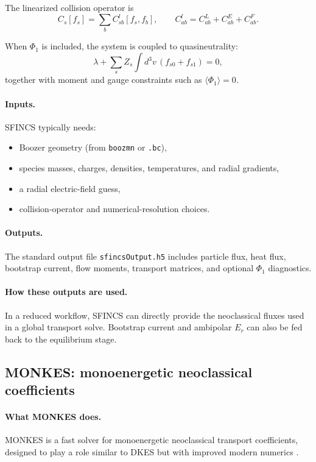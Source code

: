 \documentclass[11pt]{article}
\begin{document}
The linearized collision operator is
\begin{equation}
C_s[f_s] = \sum_b C_{sb}^l[f_s,f_b],
\qquad
C_{ab}^l = C_{ab}^L + C_{ab}^E + C_{ab}^F.
\end{equation}

When $\Phi_1$ is included, the system is coupled to quasineutrality:
\begin{equation}
\lambda + \sum_s Z_s\int d^3v\,(f_{s0}+f_{s1}) = 0,
\end{equation}
together with moment and gauge constraints such as $\langle\Phi_1\rangle=0$.

\paragraph{Inputs.}
SFINCS typically needs:
\begin{itemize}
  \item Boozer geometry (from \texttt{boozmn} or \texttt{.bc}),
  \item species masses, charges, densities, temperatures, and radial gradients,
  \item a radial electric-field guess,
  \item collision-operator and numerical-resolution choices.
\end{itemize}

\paragraph{Outputs.}
The standard output file \texttt{sfincsOutput.h5} includes particle flux, heat
flux, bootstrap current, flow moments, transport matrices, and optional
$\Phi_1$ diagnostics.

\paragraph{How these outputs are used.}
In a reduced workflow, SFINCS can directly provide the neoclassical fluxes used
in a global transport solve. Bootstrap current and ambipolar $E_r$ can also be
fed back to the equilibrium stage.

\subsection{MONKES: monoenergetic neoclassical coefficients}

\paragraph{What MONKES does.}
MONKES is a fast solver for monoenergetic neoclassical transport coefficients,
designed to play a role similar to DKES but with improved modern numerics
\citep{Escoto2024MONKES,MONKESRepo}.
\end{document}
